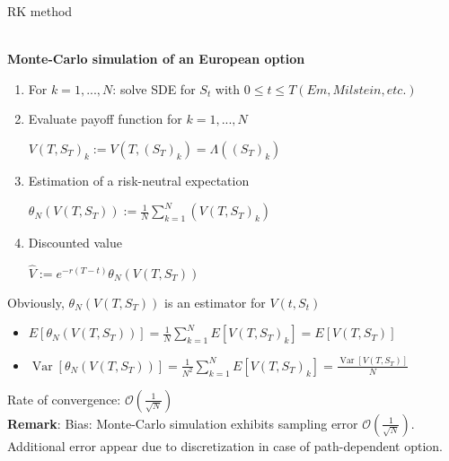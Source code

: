 \documentclass{article}
\begin{document}
\begin{algorithm}
\caption{RK method}\label{algorithm}
\end{algorithm}
\newpage~\\
\textbf{Monte-Carlo simulation of an European option}
\begin{enumerate}[1.]
	\item For $k=1,...,N$: solve SDE for $S_t$ with $0\leqslant t\leqslant T(Em, Milstein, etc.)$
	\item Evaluate payoff function for $k=1,...,N$\begin{center}
		$V\left(T, S_{T}\right)_{k}:=V\left(T,\left(S_{T}\right)_{k}\right)=\Lambda\left(\left(S_{T}\right)_{k}\right)$
	\end{center}
	\item Estimation of a risk-neutral expectation\begin{center}
		$\theta_{N}\left(V\left(T, S_{T}\right)\right):=\frac{1}{N} \sum_{k=1}^{N}\left(V\left(T, S_{T}\right)_{k}\right)$
	\end{center}
	\item Discounted value\begin{center}
		$\hat{V}:=e^{-r(T-t)} \theta_{N}\left(V\left(T, S_{T}\right)\right)$
	\end{center}
\end{enumerate}
Obviously, $\theta_{N}\left(V\left(T, S_{T}\right)\right)$ is an estimator for $V(t,S_t)$
\begin{itemize}
	\item $E\left[\theta_{N}\left(V\left(T, S_{T}\right)\right)\right]=\frac{1}{N} \sum_{k=1}^{N} E\left[V\left(T, S_{T}\right)_{k}\right]=E\left[V\left(T, S_{T}\right)\right]$
	\item $\operatorname{Var}\left[\theta_{N}\left(V\left(T, S_{T}\right)\right)\right]=\frac{1}{N^{2}} \sum_{k=1}^{N} E\left[V\left(T, S_{T}\right)_{k}\right]=\frac{\operatorname{Var}\left[V\left(T, S_{T}\right)\right]}{N}$
\end{itemize}
Rate of convergence: $\mathcal{O} \left( \frac{1}{\sqrt{N} } \right)  $\\
\textbf{Remark}: Bias: Monte-Carlo simulation exhibits sampling error $\mathcal{O} \left( \frac{1}{\sqrt{N} } \right)  $. Additional error appear due to discretization in case of path-dependent option.
\end{document}
